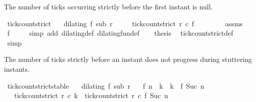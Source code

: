 \begin{isabellebody}
{\isafoldproof}%
%
\isadelimproof
%
\endisadelimproof
%
\begin{isamarkuptext}%
The number of ticks occurring strictly before the first instant is null.%
\end{isamarkuptext}\isamarkuptrue%
\isamarkupfalse%
\ tick{\isacharunderscore}count{\isacharunderscore}strict{\isacharunderscore}{}{\isacharcolon}\isanewline
\ \ \ {\isacartoucheopen}dilating\ f\ sub\ r{\isacartoucheclose}\isanewline
\ \ \ \ \ {\isacartoucheopen}tick{\isacharunderscore}count{\isacharunderscore}strict\ r\ c\ {\isacharparenleft}f\ {}{\isacharparenright}\ {\isacharequal}\ {}{\isacartoucheclose}\isanewline
%
\isadelimproof
%
\endisadelimproof
%
\isatagproof
{}\isamarkupfalse%
\ {\isacharminus}\isanewline
\ \ \isamarkupfalse%
\ assms\ \isamarkupfalse%
\ {\isacartoucheopen}f\ {}\ {\isacharequal}\ {}{\isacartoucheclose}\ \isamarkupfalse%
\ {\isacharparenleft}simp\ add{\isacharcolon}\ dilating{\isacharunderscore}def\ dilating{\isacharunderscore}fun{\isacharunderscore}def{\isacharparenright}\isanewline
\ \ \isamarkupfalse%
\ {\isacharquery}thesis\ \isamarkupfalse%
\ tick{\isacharunderscore}count{\isacharunderscore}strict{\isacharunderscore}def\ \isamarkupfalse%
\ simp\isanewline
{}\isamarkupfalse%
%
\endisatagproof
{\isafoldproof}%
%
\isadelimproof
%
\endisadelimproof
%
\begin{isamarkuptext}%
The number of ticks strictly before an instant does not progress
  during stuttering instants.%
\end{isamarkuptext}\isamarkuptrue%
\isamarkupfalse%
\ tick{\isacharunderscore}count{\isacharunderscore}strict{\isacharunderscore}stable{\isacharcolon}\isanewline
\ \ \ {\isacartoucheopen}dilating\ f\ sub\ r{\isacartoucheclose}\isanewline
\ \ \ {\isacartoucheopen}{\isacharparenleft}f\ n{\isacharparenright}\ {\isacharless}\ k\ {\isasymand}\ k\ {\isacharless}\ {\isacharparenleft}f\ {\isacharparenleft}Suc\ n{\isacharparenright}{\isacharparenright}{\isacartoucheclose}\isanewline
\ \ \ {\isacartoucheopen}tick{\isacharunderscore}count{\isacharunderscore}strict\ r\ c\ k\ {\isacharequal}\ tick{\isacharunderscore}count{\isacharunderscore}strict\ r\ c\ {\isacharparenleft}f\ {\isacharparenleft}Suc\ n{\isacharparenright}{\isacharparenright}{\isacartoucheclose}\isanewline

\end{isabellebody}
